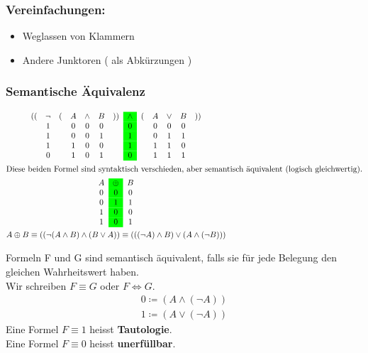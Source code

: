 \subsubsection{Vereinfachungen:}
\begin{itemize}
	\item Weglassen von Klammern
	\item Andere Junktoren ( als Abkürzungen )
\end{itemize}
\subsubsection{Semantische Äquivalenz}
\begin{gather*}
	\begin{array}{ c c c c c c c >{\columncolor{green}}c c c c c c }
		((	& \neg	& (	& A	& \wedge	& B	& ))	& \wedge	& (	& A	& \vee	& B	& ))	\\
			& 1		&	& 0	& 0		& 0	&	& 0		&	& 0	& 0		& 0		\\
			& 1		&	& 0	& 0		& 1	&	& 1		&	& 0	& 1		& 1		\\
			& 1		&	& 1	& 0		& 0	&	& 1		&	& 1	& 1		& 0		\\
			& 0		&	& 1	& 0		& 1	&	& 0		&	& 1	& 1		& 1					
	\end{array}\\
	\intertext{Diese beiden Formel sind syntaktisch verschieden, aber semantisch äquivalent (logisch gleichwertig).}
	\begin{array}{ c >{\columncolor{green}}c c }
		A	& \oplus	& B	\\
		0	& 0		& 0	\\
		0	& 1		& 1	\\
		1	& 0		& 0	\\
		1	& 0		& 1	
	\end{array}\\
	A \oplus B \equiv (( \neg ( A \wedge B ) \wedge ( B \vee A )) \equiv ((( \neg A ) \wedge B ) \vee ( A \wedge ( \neg B )))
\end{gather*}
\begin{def*}[note = {semantische Äquivalenz, Tautologie, Unerfüllbarkeit} , index = Semantik!Äquivalenz]
	Formeln F und G sind semantisch äquivalent, falls sie für jede Belegung den gleichen Wahrheitswert haben. \\
 	Wir schreiben $F \equiv G$ oder $F \iff G$. \\
	\begin{gather*}
		0 \coloneqq ( A \wedge ( \neg A ) ) \\
		1 \coloneqq ( A \vee ( \neg A ) )
	\end{gather*}
	Eine Formel $F \equiv 1$ heisst \textbf{Tautologie}.\\
	Eine Formel $F \equiv 0$ heisst \textbf{unerfüllbar}.
\end{def*}

